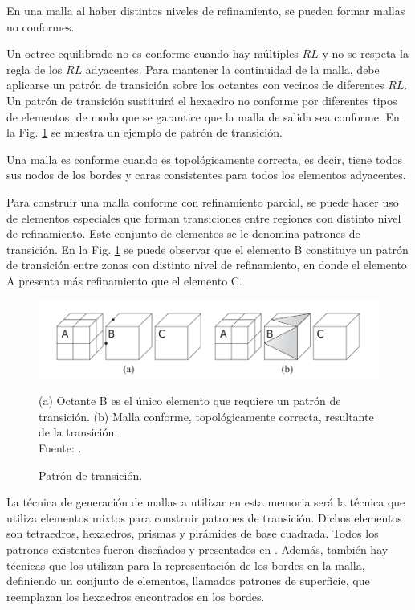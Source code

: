 En una malla al haber distintos niveles de refinamiento, se pueden formar mallas no conformes. 

Un octree equilibrado no es conforme cuando hay múltiples $RL$ y no se respeta la regla de los $RL$ adyacentes. Para mantener la continuidad de la malla, debe aplicarse un patrón de transición sobre los octantes con vecinos de diferentes $RL$. Un patrón de transición sustituirá el hexaedro no conforme por diferentes tipos de elementos, de modo que se garantice que la malla de salida sea conforme. En la Fig. \ref{fig:transition_pattern}  se muestra un ejemplo de patrón de transición.

Una malla es conforme cuando es topológicamente correcta, es decir, tiene todos sus nodos de los bordes y caras consistentes para todos los elementos adyacentes. 

Para construir una malla conforme con refinamiento parcial, se puede hacer uso de elementos especiales que forman transiciones entre regiones con distinto nivel de refinamiento. Este conjunto de elementos se le denomina patrones de transición. En la Fig. \ref{fig:transition_pattern} se puede observar que el elemento B constituye un patrón de transición entre zonas con distinto nivel de refinamiento, en donde el elemento A presenta más refinamiento que el elemento C.

\begin{figure}[!ht]
    \centering
    \includegraphics[width=1\textwidth]{figures/transition_pattern_complete.png}
    \caption{\label{fig:transition_pattern} Patrón de transición.} 
    \small{(a) Octante B es el único elemento que requiere un patrón de transición. (b) Malla conforme, topológicamente correcta, resultante de la transición.} \\ Fuente: \cite{lobos2015mixed}.
\end{figure}

La técnica de generación de mallas a utilizar en esta memoria será la técnica que utiliza elementos mixtos para construir patrones de transición.
Dichos elementos son tetraedros, hexaedros, prismas y pirámides de base cuadrada. Todos los patrones existentes fueron diseñados y presentados en \cite{Gonzalez2014}. Además, también hay técnicas que los utilizan para la representación de los bordes en la malla, definiendo un conjunto de elementos, llamados patrones de superficie, que reemplazan los hexaedros encontrados en los bordes.

